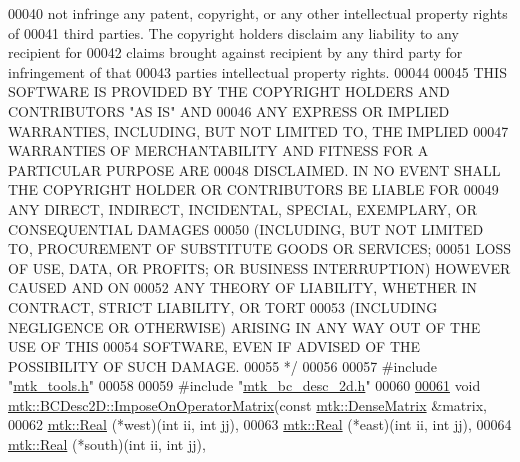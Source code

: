 \begin{DoxyCode}
00040 \textcolor{comment}{not infringe any patent, copyright, or any other intellectual property rights of}
00041 \textcolor{comment}{third parties. The copyright holders disclaim any liability to any recipient for}
00042 \textcolor{comment}{claims brought against recipient by any third party for infringement of that}
00043 \textcolor{comment}{parties intellectual property rights.}
00044 \textcolor{comment}{}
00045 \textcolor{comment}{THIS SOFTWARE IS PROVIDED BY THE COPYRIGHT HOLDERS AND CONTRIBUTORS "AS IS" AND}
00046 \textcolor{comment}{ANY EXPRESS OR IMPLIED WARRANTIES, INCLUDING, BUT NOT LIMITED TO, THE IMPLIED}
00047 \textcolor{comment}{WARRANTIES OF MERCHANTABILITY AND FITNESS FOR A PARTICULAR PURPOSE ARE}
00048 \textcolor{comment}{DISCLAIMED. IN NO EVENT SHALL THE COPYRIGHT HOLDER OR CONTRIBUTORS BE LIABLE FOR}
00049 \textcolor{comment}{ANY DIRECT, INDIRECT, INCIDENTAL, SPECIAL, EXEMPLARY, OR CONSEQUENTIAL DAMAGES}
00050 \textcolor{comment}{(INCLUDING, BUT NOT LIMITED TO, PROCUREMENT OF SUBSTITUTE GOODS OR SERVICES;}
00051 \textcolor{comment}{LOSS OF USE, DATA, OR PROFITS; OR BUSINESS INTERRUPTION) HOWEVER CAUSED AND ON}
00052 \textcolor{comment}{ANY THEORY OF LIABILITY, WHETHER IN CONTRACT, STRICT LIABILITY, OR TORT}
00053 \textcolor{comment}{(INCLUDING NEGLIGENCE OR OTHERWISE) ARISING IN ANY WAY OUT OF THE USE OF THIS}
00054 \textcolor{comment}{SOFTWARE, EVEN IF ADVISED OF THE POSSIBILITY OF SUCH DAMAGE.}
00055 \textcolor{comment}{*/}
00056 
00057 \textcolor{preprocessor}{#include "\hyperlink{mtk__tools_8h}{mtk\_tools.h}"}
00058 
00059 \textcolor{preprocessor}{#include "\hyperlink{mtk__bc__desc__2d_8h}{mtk\_bc\_desc\_2d.h}"}
00060 
\hypertarget{mtk__bc__desc__2d_8cc_source_l00061}{}\hyperlink{classmtk_1_1BCDesc2D_a1d03ee7abaa6d95649a9ba3c71e407cd}{00061} \textcolor{keywordtype}{void} \hyperlink{classmtk_1_1BCDesc2D_a1d03ee7abaa6d95649a9ba3c71e407cd}{mtk::BCDesc2D::ImposeOnOperatorMatrix}(\textcolor{keyword}{const} 
      \hyperlink{classmtk_1_1DenseMatrix}{mtk::DenseMatrix} &matrix,
00062                                            \hyperlink{group__c01-roots_gac080bbbf5cbb5502c9f00405f894857d}{mtk::Real} (*west)(\textcolor{keywordtype}{int} ii, \textcolor{keywordtype}{int} jj),
00063                                            \hyperlink{group__c01-roots_gac080bbbf5cbb5502c9f00405f894857d}{mtk::Real} (*east)(\textcolor{keywordtype}{int} ii, \textcolor{keywordtype}{int} jj),
00064                                            \hyperlink{group__c01-roots_gac080bbbf5cbb5502c9f00405f894857d}{mtk::Real} (*south)(\textcolor{keywordtype}{int} ii, \textcolor{keywordtype}{int} jj),

\end{DoxyCode}
